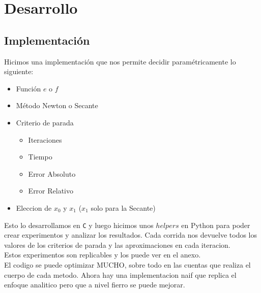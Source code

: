 \section{Desarrollo}

\subsection{Implementación}

Hicimos una implementación que nos permite decidir paramétricamente lo siguiente:

\begin{itemize}
    \item Función $e$ o $f$
    \item Método Newton o Secante
    \item Criterio de parada
    \begin{itemize}
        \item Iteraciones
        \item Tiempo
        \item Error Absoluto
        \item Error Relativo
    \end{itemize}
    \item Eleccion de $x_0$ y $x_1$ ($x_1$ solo para la Secante)
\end{itemize}

Esto lo desarrollamos en \verb|C| y luego hicimos unos $helpers$ en Python para poder
crear experimentos y analizar los resultados. Cada corrida nos devuelve todos
los valores de los criterios de parada y las aproximaciones en cada iteracion.\\

Estos experimentos son replicables y los puede ver en el anexo.\\

El codigo se puede optimizar MUCHO, sobre todo en las cuentas que realiza el
cuerpo de cada metodo. Ahora hay una implementacion naif que replica el enfoque
analitico pero que a nivel fierro se puede mejorar.\\

